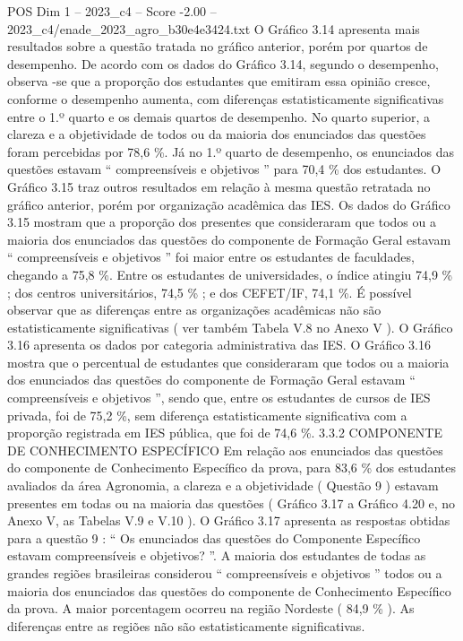 \begin{textsample}{POS Dim 1 – 2023\_c4 – Score -2.00 – 2023\_c4/enade\_2023\_agro\_b30e4e3424.txt}
O Gráfico 3.14 apresenta mais resultados sobre a questão tratada no gráfico anterior, porém por quartos de desempenho.
De acordo com os dados do Gráfico 3.14, segundo o desempenho, observa -se que a proporção dos estudantes que emitiram essa opinião cresce, conforme o desempenho aumenta, com diferenças estatisticamente significativas entre o 1.º quarto e os demais quartos de desempenho.
No quarto superior, a clareza e a objetividade de todos ou da maioria dos enunciados das questões foram percebidas por 78,6 \%.
Já no 1.º quarto de desempenho, os enunciados das questões estavam “ compreensíveis e objetivos ” para 70,4 \% dos estudantes.
O Gráfico 3.15 traz outros resultados em relação à mesma questão retratada no gráfico anterior, porém por organização acadêmica das IES.
Os dados do Gráfico 3.15 mostram que a proporção dos presentes que consideraram que todos ou a maioria dos enunciados das questões do componente de Formação Geral estavam “ compreensíveis e objetivos ” foi maior entre os estudantes de faculdades, chegando a 75,8 \%.
Entre os estudantes de universidades, o índice atingiu 74,9 \% ; dos centros universitários, 74,5 \% ; e dos CEFET/IF, 74,1 \%.
É possível observar que as diferenças entre as organizações acadêmicas não são estatisticamente significativas ( ver também Tabela V.8 no Anexo V ).
O Gráfico 3.16 apresenta os dados por categoria administrativa das IES.
O Gráfico 3.16 mostra que o percentual de estudantes que consideraram que todos ou a maioria dos enunciados das questões do componente de Formação Geral estavam “ compreensíveis e objetivos ”, sendo que, entre os estudantes de cursos de IES privada, foi de 75,2 \%, sem diferença estatisticamente significativa com a proporção registrada em IES pública, que foi de 74,6 \%. 3.3.2 COMPONENTE DE CONHECIMENTO ESPECÍFICO Em relação aos enunciados das questões do componente de Conhecimento Específico da prova, para 83,6 \% dos estudantes avaliados da área Agronomia, a clareza e a objetividade ( Questão 9 ) estavam presentes em todas ou na maioria das questões ( Gráfico 3.17 a Gráfico 4.20 e, no Anexo V, as Tabelas V.9 e V.10 ).
O Gráfico 3.17 apresenta as respostas obtidas para a questão 9 : “ Os enunciados das questões do Componente Específico estavam compreensíveis e objetivos? ”.
A maioria dos estudantes de todas as grandes regiões brasileiras considerou “ compreensíveis e objetivos ” todos ou a maioria dos enunciados das questões do componente de Conhecimento Específico da prova.
A maior porcentagem ocorreu na região Nordeste ( 84,9 \% ).
As diferenças entre as regiões não são estatisticamente significativas.

\end{textsample}
